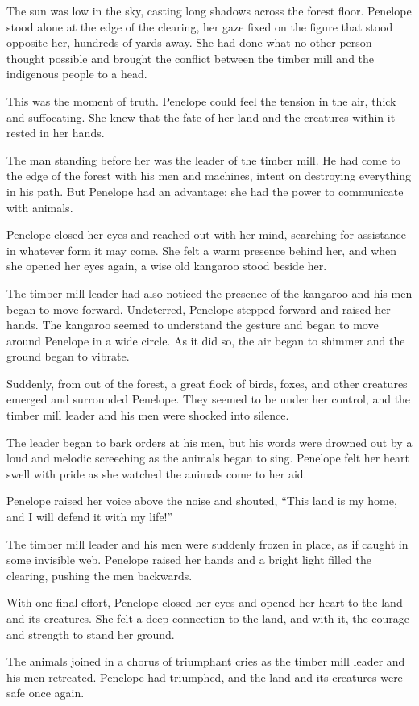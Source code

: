 

The sun was low in the sky, casting long shadows across the forest floor. Penelope stood alone at the edge of the clearing, her gaze fixed on the figure that stood opposite her, hundreds of yards away. She had done what no other person thought possible and brought the conflict between the timber mill and the indigenous people to a head.

This was the moment of truth. Penelope could feel the tension in the air, thick and suffocating. She knew that the fate of her land and the creatures within it rested in her hands.

The man standing before her was the leader of the timber mill. He had come to the edge of the forest with his men and machines, intent on destroying everything in his path. But Penelope had an advantage: she had the power to communicate with animals.

Penelope closed her eyes and reached out with her mind, searching for assistance in whatever form it may come. She felt a warm presence behind her, and when she opened her eyes again, a wise old kangaroo stood beside her.

The timber mill leader had also noticed the presence of the kangaroo and his men began to move forward. Undeterred, Penelope stepped forward and raised her hands. The kangaroo seemed to understand the gesture and began to move around Penelope in a wide circle. As it did so, the air began to shimmer and the ground began to vibrate.

Suddenly, from out of the forest, a great flock of birds, foxes, and other creatures emerged and surrounded Penelope. They seemed to be under her control, and the timber mill leader and his men were shocked into silence.

The leader began to bark orders at his men, but his words were drowned out by a loud and melodic screeching as the animals began to sing. Penelope felt her heart swell with pride as she watched the animals come to her aid.

Penelope raised her voice above the noise and shouted, “This land is my home, and I will defend it with my life!”

The timber mill leader and his men were suddenly frozen in place, as if caught in some invisible web. Penelope raised her hands and a bright light filled the clearing, pushing the men backwards.

With one final effort, Penelope closed her eyes and opened her heart to the land and its creatures. She felt a deep connection to the land, and with it, the courage and strength to stand her ground.

The animals joined in a chorus of triumphant cries as the timber mill leader and his men retreated. Penelope had triumphed, and the land and its creatures were safe once again.